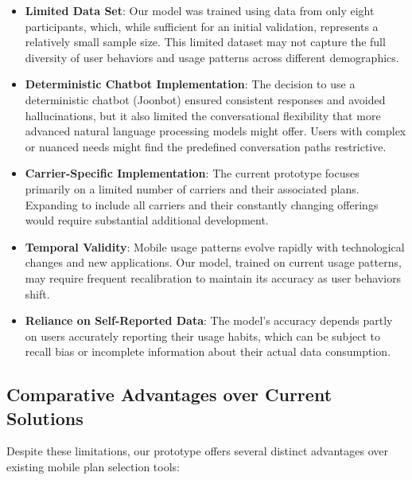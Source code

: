 \documentclass[conference]{IEEEtran}
\begin{document}
\begin{itemize}
    \item \textbf{Limited Data Set}: Our model was trained using data from only eight participants, which, while sufficient for an initial validation, represents a relatively small sample size. This limited dataset may not capture the full diversity of user behaviors and usage patterns across different demographics.
    
    \item \textbf{Deterministic Chatbot Implementation}: The decision to use a deterministic chatbot (Joonbot) ensured consistent responses and avoided hallucinations, but it also limited the conversational flexibility that more advanced natural language processing models might offer. Users with complex or nuanced needs might find the predefined conversation paths restrictive.
    
    \item \textbf{Carrier-Specific Implementation}: The current prototype focuses primarily on a limited number of carriers and their associated plans. Expanding to include all carriers and their constantly changing offerings would require substantial additional development. 
    
    
    \item \textbf{Temporal Validity}: Mobile usage patterns evolve rapidly with technological changes and new applications. Our model, trained on current usage patterns, may require frequent recalibration to maintain its accuracy as user behaviors shift.
    
    \item \textbf{Reliance on Self-Reported Data}: The model's accuracy depends partly on users accurately reporting their usage habits, which can be subject to recall bias or incomplete information about their actual data consumption.
\end{itemize}

\subsection{Comparative Advantages over Current Solutions}

Despite these limitations, our prototype offers several distinct advantages over existing mobile plan selection tools:
\end{document}
